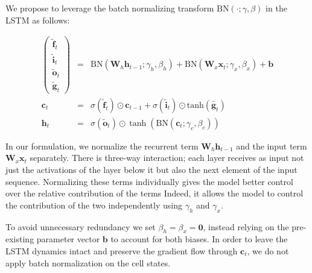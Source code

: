 \documentclass{article} %
\newcommand{\vect}[1]{\mathbf{#1}}
\newcommand{\mat}[1]{\mathbf{#1}}
\newcommand{\ewprod}{\odot}
\begin{document}
We propose to leverage the batch normalizing transform $\mathrm{BN}(\cdot; \gamma, \beta)$ in the LSTM as follows:

\begin{eqnarray}
\left(\begin{array}{ccc}
\tilde{\vect{f}}_t \\
\tilde{\vect{i}}_t \\
\tilde{\vect{o}}_t \\
\tilde{\vect{g}}_t
\end{array}\right)
 &=&
 \mathrm{BN} (\mat{W}_h \vect{h}_{t-1}; \gamma_h, \beta_h) +
 \mathrm{BN} (\mat{W}_x \vect{x}_t    ; \gamma_x, \beta_x) +
 \vect{b}
\\
\vect{c}_t &=& \sigma(\tilde{\vect{f}}_t) \ewprod \vect{c}_{t-1} +
              \sigma(\tilde{\vect{i}}_t) \ewprod \mathrm{tanh}(\tilde{\vect{g}_t}) \\
\vect{h}_t &=& \sigma(\tilde{\vect{o}}_t) \ewprod \tanh(
 \mathrm{BN} (\vect{c}_t; \gamma_c, \beta_c)
)
\end{eqnarray}

In our formulation, we normalize the recurrent term $\mat{W}_h \vect{h}_{t-1}$ and the input term $\mat{W}_x \vect{x}_t$ separately.
There is three-way interaction; each layer receives as input not just the activations of the layer below it but also the next element of the input sequence.
Normalizing these terms individually gives the model better control over the relative contribution of the terms
Indeed, it allows the model to control the contribution of the two independently using $\gamma_h$ and $\gamma_x$.

To avoid unnecessary redundancy we set $\beta_h = \beta_x = \vect{0}$, instead relying on the pre-existing parameter vector $\vect{b}$ to account for both biases.
In order to leave the LSTM dynamics intact and preserve the gradient flow through $\vect{c}_t$, we do not apply batch normalization on the cell states.
\end{document}
